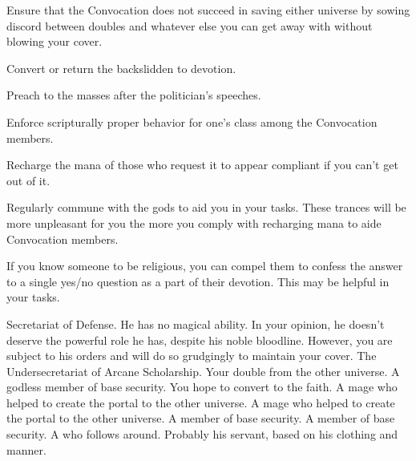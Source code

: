 \documentclass[char]{guildcamp3}
\begin{document}
\begin{itemz}[Goals]
  \item Ensure that the Convocation does not succeed in saving either universe by sowing discord between doubles and whatever else you can get away with without blowing your cover.
  \item Convert or return the backslidden to devotion.
  \item Preach to the masses after the politician's speeches.
  \item Enforce scripturally proper behavior for one's class among the Convocation members.
  \item Recharge the mana of those who request it to appear compliant if you can't get out of it.
  \item Regularly commune with the gods to aid you in your tasks. These trances will be more unpleasant for you the more you comply with recharging mana to aide Convocation members.
\end{itemz}

\begin{itemz}[Notes]
  \item If you know someone to be religious, you can compel them to confess the answer to a single yes/no question as a part of their devotion. This may be helpful in your tasks.
\end{itemz}


\begin{contacts}
  \contact{\cNobleOne{}} Secretariat of Defense. He has no magical ability. In your opinion, he doesn't deserve the powerful role he has, despite his noble bloodline. However, you are subject to his orders and will do so grudgingly to maintain your cover.
  \contact{\cNobleTwo{}} The Undersecretariat of Arcane Scholarship. 
  \contact{\cSpecOpTwo{}} Your double from the other universe. A godless member of base security. You hope to convert \cSpecOpTwo{\them} to the faith.
  \contact{\cMageOne{}} A mage who helped to create the portal to the other universe.
  \contact{\cMageTwo{}} A mage who helped to create the portal to the other universe. 
  \contact{\cRogueOne{}} A member of base security.
  \contact{\cRogueTwo{}} A member of base security.
  \contact{\cServant{}} A \cServant{\human} who follows \cNobleOne{} around. Probably his servant, based on his clothing and manner.
\end{contacts}
\end{document}
